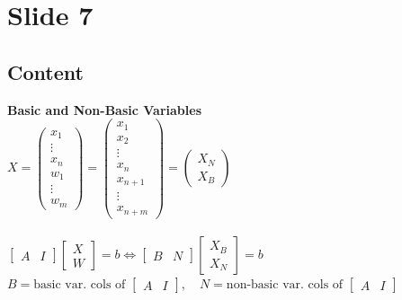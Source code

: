 \documentclass{article}%
\begin{document}
%
\newpage%
\section{Slide 7}%
\label{sec:Slide7}%
\subsection{Content}%

\textbf{Basic and Non-Basic Variables} \\
$X = \begin{pmatrix} x_1 \\ \vdots \\ x_n \\ w_1 \\ \vdots \\ w_m \end{pmatrix} = \begin{pmatrix} x_1 \\ x_2 \\ \vdots \\ x_n \\ x_{n+1} \\ \vdots \\ x_{n+m} \end{pmatrix} = \begin{pmatrix} X_N \\ X_B \end{pmatrix}$
\qquad {} \\
\qquad {} \\
$\begin{bmatrix} A & I \end{bmatrix} \begin{bmatrix} X \\ W \end{bmatrix} = b \iff \begin{bmatrix} B & N \end{bmatrix} \begin{bmatrix} X_B \\ X_N \end{bmatrix} = b$ \\
$B = \text{basic var. cols of } \begin{bmatrix} A & I \end{bmatrix}, \quad N = \text{non-basic var. cols of } \begin{bmatrix} A & I \end{bmatrix}$
%
\end{document}
